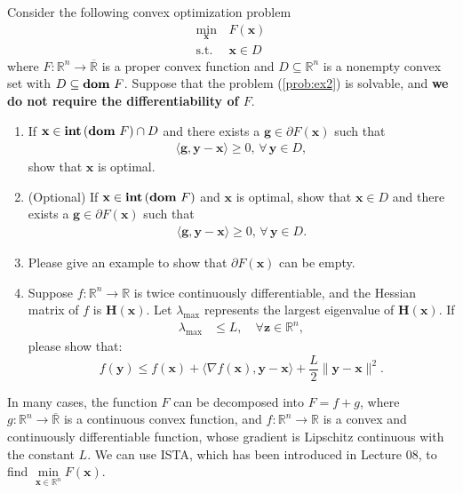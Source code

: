 \documentclass[11pt,letter,notitlepage]{article}
\DeclareMathOperator*{\dom}{\bf dom\,}
\DeclareMathOperator*{\intp}{\bf int\,}
\begin{document}
\newpage
\begin{exercise}
Consider the following convex optimization problem
\begin{align}\label{prob:ex2}
    \min_\textbf{x}\, &F(\textbf{x})\\
    \nonumber\text{s.t.} &\textbf{x}\in D
\end{align}
where $F:\mathbb{R}^n\rightarrow\overline{\mathbb{R}}$ is a proper convex function and $D\subseteq\mathbb{R}^n$
is a nonempty convex set with $D\subseteq\dom F$. Suppose that the problem (\ref{prob:ex2}) is solvable, and {\bf we do not require the differentiability of $F$}.
\begin{enumerate}
    \item If $\textbf{x}\in\intp(\dom F) \cap D$ and there exists a $\textbf{g}\in\partial F(\textbf{x})$ such that
    \begin{align*}
        \langle \textbf{g},\textbf{y}-\textbf{x} \rangle\ge 0,\, \forall\, \textbf{y}\in D,
    \end{align*}
    show that $\textbf{x}$ is optimal.
    \item (Optional) If $\textbf{x}\in\intp(\dom F)$ and $\textbf{x}$ is optimal, show that $\textbf{x}\in D$ and there exists a $\textbf{g}\in\partial F(\textbf{x})$ such that
    \begin{align*}
        \langle \textbf{g},\textbf{y}-\textbf{x} \rangle\ge 0,\, \forall\, \textbf{y}\in D.
    \end{align*}


    \item Please give an example to show that $\partial F(\textbf{x})$ can be empty.

    \item Suppose \( f: \mathbb{R}^n \to \mathbb{R} \) is twice continuously differentiable, and the Hessian matrix of \( f \) is \( \mathbf{H}(\mathbf{x}) \). Let $\lambda_{\max}$ represents the largest eigenvalue of \( \mathbf{H}(\mathbf{x}) \). If \begin{align*}
    \lambda_{\max} &\leq L, \quad \forall \mathbf{z} \in \mathbb{R}^n,
\end{align*}
please show that:
\[
f(\mathbf{y}) \leq f(\mathbf{x}) + \langle \nabla f(\mathbf{x}), \mathbf{y} - \mathbf{x} \rangle + \frac{L}{2} \|\mathbf{y} - \mathbf{x}\|^2.
\]

\end{enumerate}
In many cases, the function $F$ can be decomposed into $F=f+g$,
where $g:\mathbb{R}^n\to\overline{\mathbb{R}}$ is a continuous convex function, and $f:\mathbb{R}^n\to\mathbb{R}$ is a convex and continuously differentiable function, whose gradient is Lipschitz continuous with the constant $L$.
We can use ISTA, which has been introduced in Lecture 08, to find $\min\limits_{\textbf{x}\in\mathbb{R}^n} F(\textbf{x})$.


\end{exercise}
\end{document}
